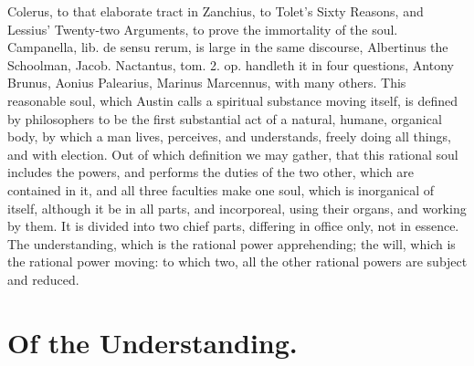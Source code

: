 {Colerus, to that elaborate tract in Zanchius, to Tolet's Sixty Reasons,
and Lessius' Twenty-two Arguments, to prove the immortality of the
soul. Campanella, lib. de sensu rerum, is large in the same discourse,
Albertinus the Schoolman, Jacob. Nactantus, tom. 2. op. handleth it in
four questions, Antony Brunus, Aonius Palearius, Marinus Marcennus,
with many others. This reasonable soul, which Austin calls a spiritual
substance moving itself, is defined by philosophers to be the first
substantial act of a natural, humane, organical body, by which a man
lives, perceives, and understands, freely doing all things, and with
election. Out of which definition we may gather, that this rational
soul includes the powers, and performs the duties of the two other,
which are contained in it, and all three faculties make one soul, which
is inorganical of itself, although it be in all parts, and incorporeal,
using their organs, and working by them. It is divided into two chief
parts, differing in office only, not in essence. The understanding,
which is the rational power apprehending; the will, which is the
rational power moving: to which two, all the other rational powers are
subject and reduced.

\section{Of the Understanding.}

}
